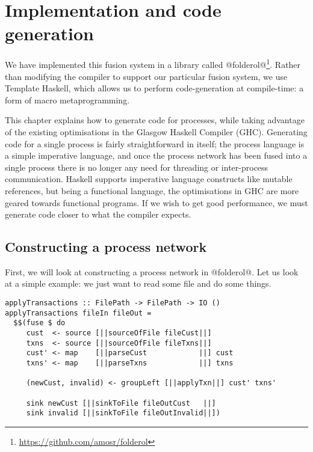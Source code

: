 \chapter{Implementation and code generation}
\label{chapter:process:implementation}


We have implemented this fusion system  in a library called @folderol@\footnote{\url{https://github.com/amosr/folderol}}.
Rather than modifying the compiler to support our particular fusion system, we use Template Haskell, which allows us to perform code-generation at compile-time: a form of macro metaprogramming.

This chapter explains how to generate code for processes, while taking advantage of the existing optimisations in the Glasgow Haskell Compiler (GHC).
Generating code for a single process is fairly straightforward in itself; the process language is a simple imperative language, and once the process network has been fused into a single process there is no longer any need for threading or inter-process communication.
Haskell supports imperative language constructs like mutable references, but being a functional language, the optimisations in GHC are more geared towards functional programs.
If we wish to get good performance, we must generate code closer to what the compiler expects.

\section{Constructing a process network}

First, we will look at constructing a process network in @folderol@.
Let us look at a simple example: we just want to read some file and do some things.
\begin{lstlisting}
applyTransactions :: FilePath -> FilePath -> IO ()
applyTransactions fileIn fileOut =
  $$(fuse $ do
     cust  <- source [||sourceOfFile fileCust||]
     txns  <- source [||sourceOfFile fileTxns||]
     cust' <- map    [||parseCust            ||] cust
     txns' <- map    [||parseTxns            ||] txns

     (newCust, invalid) <- groupLeft [||applyTxn||] cust' txns'

     sink newCust [||sinkToFile fileOutCust   ||]
     sink invalid [||sinkToFile fileOutInvalid||])
\end{lstlisting}

